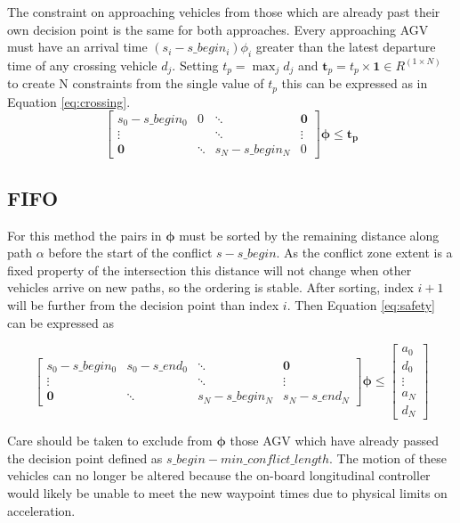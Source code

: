 \documentclass[11pt]{article} %
\begin{document}
The constraint on approaching vehicles from those which are already past their own decision point is the same for both approaches. Every approaching AGV must have an arrival time $(s_i - s\_begin_i)\phi_i$ greater than the latest departure time of any crossing vehicle $d_j$. Setting $t_p = \max_j{d_j}$ and $\bm{t}_p = t_p \times \bm{1}\in R^{(1 \times N)}$ to create N constraints from the single value of $t_p$ this can be expressed  
as in Equation \ref{eq:crossing}.
\begin{equation}
\label{eq:crossing}
\left[\begin{array}{cccc}
	s_0 - s\_begin_0 & 	0 & \ddots & \bm{0}\\
	\vdots & & \ddots & \vdots \\
	\bm{0} & \ddots & s_N - s\_begin_N & 	0 
\end{array}\right]\bm{\phi}
\leq 
\bm{t_p}
\end{equation}
 
\subsection{FIFO}
For this method the pairs in $\bm{\phi}$ must be sorted by the remaining distance along path $\alpha$ before the start of the conflict $s - s\_begin$.  As the conflict zone extent is a fixed property of the intersection this distance will not change when other vehicles arrive on new paths, so the ordering is stable. After sorting, index $i+1$ will be further from the decision point than index $i$. Then Equation \ref{eq:safety} can be expressed as

\begin{equation}
\label{eq:fifo}
\left[\begin{array}{cccc}
	s_0 - s\_begin_0 & 	s_0 - s\_end_0 & \ddots & \bm{0}\\
	\vdots & & \ddots & \vdots \\
	\bm{0} & \ddots & s_N - s\_begin_N & 	s_N - s\_end_N 
\end{array}\right]\bm{\phi}
\leq 
\left[\begin{array}{c}
	a_0 \\
	d_0 \\
	\vdots \\
	a_N \\
	d_N
\end{array}\right]
\end{equation}

Care should be taken to exclude from $\bm{\phi}$ those AGV which have already passed the decision point defined as $s\_begin - min\_conflict\_length$. The motion of these vehicles can no longer be altered because the on-board longitudinal controller would likely be unable to meet the new waypoint times due to physical limits on acceleration. 
\end{document}
